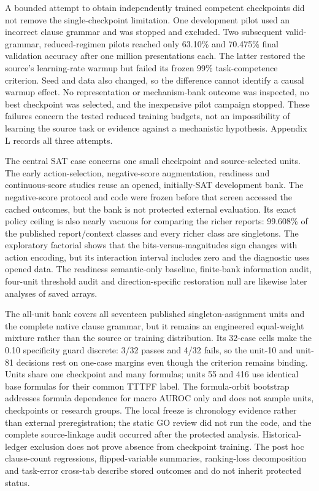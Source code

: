 \documentclass[
  british,
  11pt,
  a4paper,
]{article}
\begin{document}
A bounded attempt to obtain independently trained competent checkpoints
did not remove the single-checkpoint limitation. One development pilot
used an incorrect clause grammar and was stopped and excluded. Two
subsequent valid-grammar, reduced-regimen pilots reached only 63.10\%
and 70.475\% final validation accuracy after one million presentations
each. The latter restored the source's learning-rate warmup but failed
its frozen 99\% task-competence criterion. Seed and data also changed,
so the difference cannot identify a causal warmup effect. No
representation or mechanism-bank outcome was inspected, no best
checkpoint was selected, and the inexpensive pilot campaign stopped.
These failures concern the tested reduced training budgets, not an
impossibility of learning the source task or evidence against a
mechanistic hypothesis. Appendix L records all three attempts.

The central SAT case concerns one small checkpoint and source-selected
units. The early action-selection, negative-score augmentation,
readiness and continuous-score studies reuse an opened, initially-SAT
development bank. The negative-score protocol and code were frozen
before that screen accessed the cached outcomes, but the bank is not
protected external evaluation. Its exact policy ceiling is also nearly
vacuous for comparing the richer reports: 99.608\% of the published
report/context classes and every richer class are singletons. The
exploratory factorial shows that the bits-versus-magnitudes sign changes
with action encoding, but its interaction interval includes zero and the
diagnostic uses opened data. The readiness semantic-only baseline,
finite-bank information audit, four-unit threshold audit and
direction-specific restoration null are likewise later analyses of saved
arrays.

The all-unit bank covers all seventeen published singleton-assignment
units and the complete native clause grammar, but it remains an
engineered equal-weight mixture rather than the source or training
distribution. Its 32-case cells make the 0.10 specificity guard
discrete: 3/32 passes and 4/32 fails, so the unit-10 and unit-81
decisions rest on one-case margins even though the criterion remains
binding. Units share one checkpoint and many formulas; units 55 and 416
use identical base formulas for their common TTTFF label. The
formula-orbit bootstrap addresses formula dependence for macro AUROC
only and does not sample units, checkpoints or research groups. The
local freeze is chronology evidence rather than external
preregistration; the static GO review did not run the code, and the
complete source-linkage audit occurred after the protected analysis.
Historical-ledger exclusion does not prove absence from checkpoint
training. The post hoc clause-count regressions, flipped-variable
summaries, ranking-loss decomposition and task-error cross-tab describe
stored outcomes and do not inherit protected status.
\end{document}
